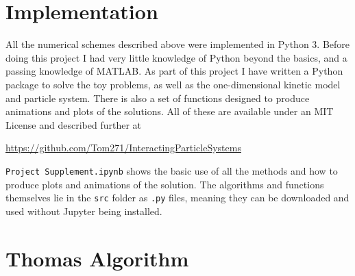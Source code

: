 \documentclass[11pt, a4paper]{article}
\begin{document}
    \section{Implementation}\label{app:code}
    All the numerical schemes described above were implemented in Python 3. Before doing this project I had very little knowledge of Python beyond the basics, and a passing knowledge of MATLAB. As part of this project I have written a Python package to solve the toy problems, as well as the one-dimensional kinetic model and particle system. There is also a set of functions designed to produce animations and plots of the solutions. All of these are available under an MIT License and described further at 
    \begin{center}\url{https://github.com/Tom271/InteractingParticleSystems}\end{center}
    \texttt{Project Supplement.ipynb} shows the basic use of all the methods and how to produce plots and animations of the solution. The algorithms and functions themselves lie in the \texttt{src} folder as \texttt{.py} files, meaning they can be downloaded and used without Jupyter being installed.
 
    \section{Thomas Algorithm}\label{app:thomas}
    
\end{document}
